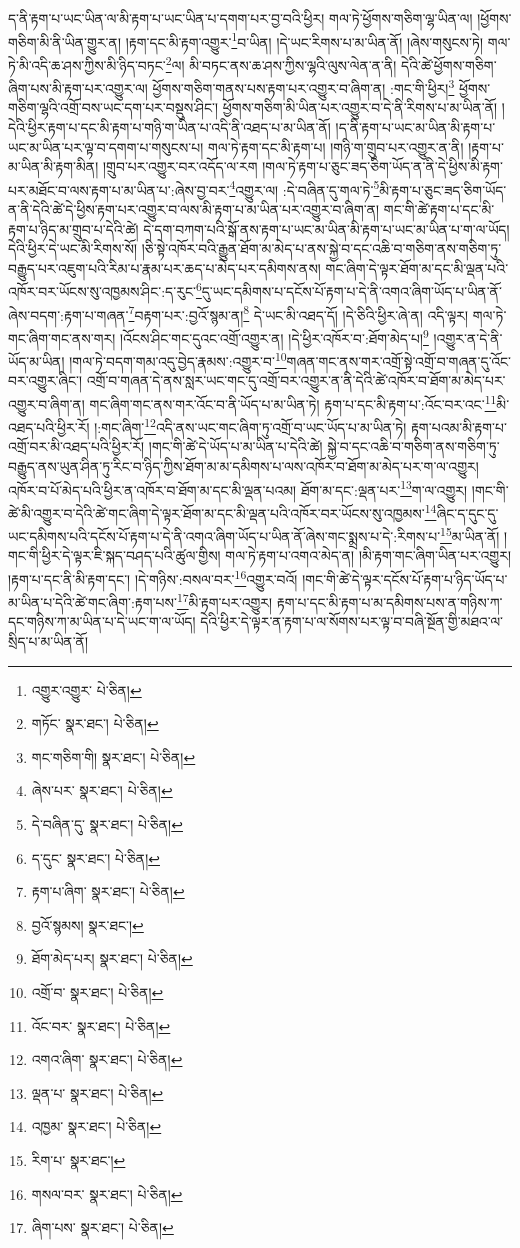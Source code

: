 ད་ནི་རྟག་པ་ཡང་ཡིན་ལ་མི་རྟག་པ་ཡང་ཡིན་པ་དགག་པར་བྱ་བའི་ཕྱིར། གལ་ཏེ་ཕྱོགས་གཅིག་ལྷ་ཡིན་ལ། །ཕྱོགས་གཅིག་མི་ནི་ཡིན་གྱུར་ན། །རྟག་དང་མི་རྟག་འགྱུར་\footnote{འགྱུར་འགྱུར་  པེ་ཅིན། }བ་ཡིན། །དེ་ཡང་རིགས་པ་མ་ཡིན་ནོ། །ཞེས་གསུངས་ཏེ། གལ་ཏེ་མི་འདི་ཆ་ཤས་ཀྱིས་མི་ཉིད་བཏང་\footnote{གཏོང་  སྣར་ཐང་།  པེ་ཅིན། }ལ། མི་བཏང་ནས་ཆ་ཤས་ཀྱིས་ལྷའི་ལུས་ལེན་ན་ནི། དེའི་ཚེ་ཕྱོགས་གཅིག་ཞིག་པས་མི་རྟག་པར་འགྱུར་ལ། ཕྱོགས་གཅིག་གནས་པས་རྟག་པར་འགྱུར་བ་ཞིག་ན། :གང་གི་ཕྱིར།\footnote{གང་གཅིག་གི།  སྣར་ཐང་།  པེ་ཅིན། } ཕྱོགས་གཅིག་ལྷའི་འགྲོ་བས་ཡང་དག་པར་བསྡུས་ཤིང་། ཕྱོགས་གཅིག་མི་ཡིན་པར་འགྱུར་བ་དེ་ནི་རིགས་པ་མ་ཡིན་ནོ། །དེའི་ཕྱིར་རྟག་པ་དང་མི་རྟག་པ་གཉི་ག་ཡིན་པ་འདི་ནི་འཐད་པ་མ་ཡིན་ནོ། །ད་ནི་རྟག་པ་ཡང་མ་ཡིན་མི་རྟག་པ་ཡང་མ་ཡིན་པར་ལྟ་བ་དགག་པ་གསུངས་པ། གལ་ཏེ་རྟག་དང་མི་རྟག་པ། །གཉི་ག་གྲུབ་པར་འགྱུར་ན་ནི། །རྟག་པ་མ་ཡིན་མི་རྟག་མིན། །གྲུབ་པར་འགྱུར་བར་འདོད་ལ་རག །གལ་ཏེ་རྟག་པ་ཅུང་ཟད་ཅིག་ཡོད་ན་ནི་དེ་ཕྱིས་མི་རྟག་པར་མཐོང་བ་ལས་རྟག་པ་མ་ཡིན་པ་:ཞེས་བྱ་བར་\footnote{ཞེས་པར་  སྣར་ཐང་།  པེ་ཅིན། }འགྱུར་ལ། :དེ་བཞིན་དུ་གལ་ཏེ་\footnote{དེ་བཞིན་དུ་  སྣར་ཐང་།  པེ་ཅིན། }མི་རྟག་པ་ཅུང་ཟད་ཅིག་ཡོད་ན་ནི་དེའི་ཚེ་དེ་ཕྱིས་རྟག་པར་འགྱུར་བ་ལས་མི་རྟག་པ་མ་ཡིན་པར་འགྱུར་བ་ཞིག་ན། གང་གི་ཚེ་རྟག་པ་དང་མི་རྟག་པ་ཉིད་མ་གྲུབ་པ་དེའི་ཚེ། དེ་དག་བཀག་པའི་སྒོ་ནས་རྟག་པ་ཡང་མ་ཡིན་མི་རྟག་པ་ཡང་མ་ཡིན་པ་ག་ལ་ཡོད། དེའི་ཕྱིར་དེ་ཡང་མི་རིགས་སོ། །ཅི་སྟེ་འཁོར་བའི་རྒྱུན་ཐོག་མ་མེད་པ་ནས་སྐྱེ་བ་དང་འཆི་བ་གཅིག་ནས་གཅིག་ཏུ་བརྒྱུད་པར་འཇུག་པའི་རིམ་པ་རྣམ་པར་ཆད་པ་མེད་པར་དམིགས་ནས། གང་ཞིག་དེ་ལྟར་ཐོག་མ་དང་མི་ལྡན་པའི་འཁོར་བར་ཡོངས་སུ་འཁྱམས་ཤིང་:ད་རུང་\footnote{ད་དུང་  སྣར་ཐང་།  པེ་ཅིན། }དུ་ཡང་དམིགས་པ་དངོས་པོ་རྟག་པ་དེ་ནི་འགའ་ཞིག་ཡོད་པ་ཡིན་ནོ་ཞེས་བདག་:རྟག་པ་གཞན་\footnote{རྟག་པ་ཞིག་  སྣར་ཐང་།  པེ་ཅིན། }བརྟག་པར་:བྱའོ་སྙམ་ན།\footnote{བྱའོ་སྙམས།  སྣར་ཐང་། } དེ་ཡང་མི་འཐད་དོ། །དེ་ཅིའི་ཕྱིར་ཞེ་ན། འདི་ལྟར། གལ་ཏེ་གང་ཞིག་གང་ནས་གར། །འོངས་ཤིང་གང་དུའང་འགྲོ་འགྱུར་ན། །དེ་ཕྱིར་འཁོར་བ་:ཐོག་མེད་པ།\footnote{ཐོག་མེད་པར།  སྣར་ཐང་།  པེ་ཅིན། } །འགྱུར་ན་དེ་ནི་ཡོད་མ་ཡིན། །གལ་ཏེ་བདག་གམ་འདུ་བྱེད་རྣམས་:འགྱུར་བ་\footnote{འགྲོ་བ་  སྣར་ཐང་།  པེ་ཅིན། }གཞན་གང་ནས་གར་འགྲོ་སྟེ་འགྲོ་བ་གཞན་དུ་འོང་བར་འགྱུར་ཞིང་། འགྲོ་བ་གཞན་དེ་ནས་སླར་ཡང་གང་དུ་འགྲོ་བར་འགྱུར་ན་ནི་དེའི་ཚེ་འཁོར་བ་ཐོག་མ་མེད་པར་འགྱུར་བ་ཞིག་ན། གང་ཞིག་གང་ནས་གར་འོང་བ་ནི་ཡོད་པ་མ་ཡིན་ཏེ། རྟག་པ་དང་མི་རྟག་པ་:འོང་བར་འང་\footnote{འོང་བར་  སྣར་ཐང་།  པེ་ཅིན། }མི་འཐད་པའི་ཕྱིར་རོ། །:གང་ཞིག་\footnote{འགའ་ཞིག་  སྣར་ཐང་།  པེ་ཅིན། }འདི་ནས་ཡང་གང་ཞིག་ཏུ་འགྲོ་བ་ཡང་ཡོད་པ་མ་ཡིན་ཏེ། རྟག་པའམ་མི་རྟག་པ་འགྲོ་བར་མི་འཐད་པའི་ཕྱིར་རོ། །གང་གི་ཚེ་དེ་ཡོད་པ་མ་ཡིན་པ་དེའི་ཚེ། སྐྱེ་བ་དང་འཆི་བ་གཅིག་ནས་གཅིག་ཏུ་བརྒྱུད་ནས་ཡུན་ཤིན་ཏུ་རིང་བ་ཉིད་ཀྱིས་ཐོག་མ་མ་དམིགས་པ་ལས་འཁོར་བ་ཐོག་མ་མེད་པར་ག་ལ་འགྱུར། འཁོར་བ་པོ་མེད་པའི་ཕྱིར་ན་འཁོར་བ་ཐོག་མ་དང་མི་ལྡན་པའམ། ཐོག་མ་དང་:ལྡན་པར་\footnote{ལྡན་པ་  སྣར་ཐང་།  པེ་ཅིན། }ག་ལ་འགྱུར། །གང་གི་ཚེ་མི་འགྱུར་བ་དེའི་ཚེ་གང་ཞིག་དེ་ལྟར་ཐོག་མ་དང་མི་ལྡན་པའི་འཁོར་བར་ཡོངས་སུ་འཁྱམས་\footnote{འཁྱམ་  སྣར་ཐང་།  པེ་ཅིན། }ཞིང་ད་དུང་དུ་ཡང་དམིགས་པའི་དངོས་པོ་རྟག་པ་དེ་ནི་འགའ་ཞིག་ཡོད་པ་ཡིན་ནོ་ཞེས་གང་སྨྲས་པ་དེ་:རིགས་པ་\footnote{རིག་པ་  སྣར་ཐང་། }མ་ཡིན་ནོ། །གང་གི་ཕྱིར་དེ་ལྟར་ཇི་སྐད་བཤད་པའི་ཚུལ་གྱིས། གལ་ཏེ་རྟག་པ་འགའ་མེད་ན། །མི་རྟག་གང་ཞིག་ཡིན་པར་འགྱུར། །རྟག་པ་དང་ནི་མི་རྟག་དང་། །དེ་གཉིས་:བསལ་བར་\footnote{གསལ་བར་  སྣར་ཐང་།  པེ་ཅིན། }འགྱུར་བའོ། །གང་གི་ཚེ་དེ་ལྟར་དངོས་པོ་རྟག་པ་ཉིད་ཡོད་པ་མ་ཡིན་པ་དེའི་ཚེ་གང་ཞིག་:རྟག་པས་\footnote{ཞིག་པས་  སྣར་ཐང་།  པེ་ཅིན། }མི་རྟག་པར་འགྱུར། རྟག་པ་དང་མི་རྟག་པ་མ་དམིགས་པས་ན་གཉིས་ཀ་དང་གཉིས་ཀ་མ་ཡིན་པ་དེ་ཡང་ག་ལ་ཡོད། དེའི་ཕྱིར་དེ་ལྟར་ན་རྟག་པ་ལ་སོགས་པར་ལྟ་བ་བཞི་སྔོན་གྱི་མཐའ་ལ་སྲིད་པ་མ་ཡིན་ནོ། 